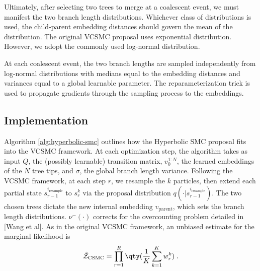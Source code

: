 \documentclass{article}
\begin{document}
Ultimately, after selecting two trees to merge at a coalescent event, we must manifest the two branch length distributions. Whichever class of distributions is used, the child-parent embedding distances should govern the mean of the distribution. The original VCSMC proposal uses exponential distribution. However, we adopt the commonly used log-normal distribution.


At each coalescent event, the two branch lengths are sampled independently from log-normal distributions with medians equal to the embedding distances and variances equal to a global learnable parameter. The reparameterization trick is used to propagate gradients through the sampling process to the embeddings.


\subsection{Implementation}


Algorithm \ref{alg:hyperbolic-smc} outlines how the Hyperbolic SMC proposal fits into the VCSMC framework. At each optimization step, the algorithm takes as input $Q$, the (possibly learnable) transition matrix, $v_0^{1:N}$, the learned embeddings of the $N$ tree tips, and $\sigma$, the global branch length variance. Following the VCSMC framework, at each step $r$, we resample the $k$ particles, then extend each partial state $s_{r-1}^{i_\text{resample}}$ to $s_r^k$ via the proposal distribution $q(\cdot | s_{r-1}^{i_\text{resample}})$. The two chosen trees dictate the new internal embedding $v_\text{parent}$, which sets the branch length distributions. $\nu^-(\cdot)$ corrects for the overcounting problem detailed in [Wang et al]. As in the original VCSMC framework, an unbiased estimate for the marginal likelihood is
\begin{align*}
  \hat{\mathcal{Z}}_\text{CSMC} = \prod_{r=1}^R \qty(\frac{1}{K} \sum_{k=1}^K w_r^k) \; .
\end{align*}
\end{document}
